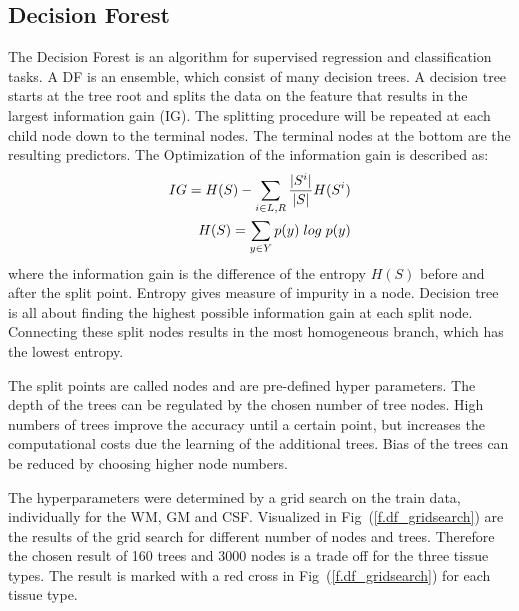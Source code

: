 \documentclass[journal]{IEEEtran}
\begin{document}
\subsection{Decision Forest}
The Decision Forest is an algorithm for supervised regression and classification tasks. A DF is an ensemble, which consist of many decision trees. A decision tree starts at the tree root and splits the data on the feature that results in the largest information gain (IG). The splitting procedure will be repeated at each child node down to the terminal nodes. The terminal nodes at the bottom are the resulting predictors. The Optimization of the information gain is described as:
\begin{equation}
	\begin{split}
		IG = H(S) -\sum_{i \in {L,R}} \frac{ \vert S ^i \vert}{\vert S \vert} H(S^i) \\
		H(S) = \sum_{y \in Y} p(y) \hspace{0.1 cm} log \hspace{0.1 cm}  p(y)\\
	\end{split}
\end{equation}
where the information gain is the difference of the entropy $H(S)$ before and after the split point. Entropy gives measure of impurity in a node. Decision tree is all about finding the highest possible information gain at each split node. Connecting these split nodes results in the most homogeneous branch, which has the lowest entropy.

The split points are called nodes and are pre-defined hyper parameters. The depth of the trees can be regulated by the chosen number of tree nodes. High numbers of trees improve the accuracy until a certain point, but increases the computational costs due the learning of the additional trees. Bias of the trees can be reduced by choosing higher node numbers.

The hyperparameters were determined by a grid search on the train data, individually for the WM, GM and CSF. Visualized in Fig~(\ref{f.df_gridsearch}) are the results of the grid search for different number of nodes and trees. Therefore the chosen result of 160 trees and 3000 nodes is a trade off for the three tissue types. The result is marked with a red cross in Fig~(\ref{f.df_gridsearch})  for each tissue type.
\end{document}
